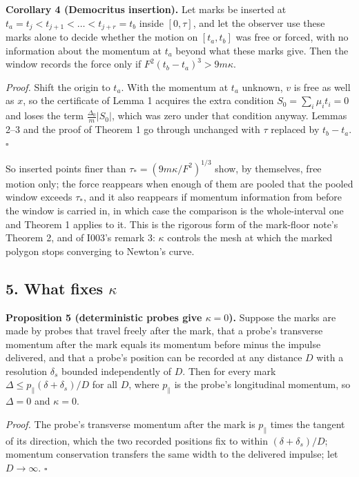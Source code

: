 \documentclass[11pt,a4paper]{article}
\begin{document}
\textbf{Corollary 4 (Democritus insertion).} Let marks be inserted at
\(t_a=t_{j}<t_{j+1}<\dots<t_{j+r}=t_b\) inside \([0,\tau]\), and let the
observer use these marks alone to decide whether the motion on
\([t_a,t_b]\) was free or forced, with no information about the momentum
at \(t_a\) beyond what these marks give. Then the window records the
force only if \(F^2(t_b-t_a)^3>9m\kappa\).

\emph{Proof.} Shift the origin to \(t_a\). With the momentum at \(t_a\)
unknown, \(v\) is free as well as \(x\), so the certificate of Lemma 1
acquires the extra condition \(S_0=\sum_i\mu_it_i=0\) and loses the term
\(\frac{\Delta_0}m|S_0|\), which was zero under that condition anyway.
Lemmas 2--3 and the proof of Theorem 1 go through unchanged with
\(\tau\) replaced by \(t_b-t_a\). \(\square\)

So inserted points finer than \(\tau_*=(9m\kappa/F^2)^{1/3}\) show, by
themselves, free motion only; the force reappears when enough of them
are pooled that the pooled window exceeds \(\tau_*\), and it also
reappears if momentum information from before the window is carried in,
in which case the comparison is the whole-interval one and Theorem 1
applies to it. This is the rigorous form of the mark-floor note's
Theorem 2, and of I003's remark 3: \(\kappa\) controls the mesh at which
the marked polygon stops converging to Newton's curve.

\hypertarget{what-fixes-kappa}{%
\subsection{\texorpdfstring{5. What fixes
\(\kappa\)}{5. What fixes \textbackslash kappa}}\label{what-fixes-kappa}}

\textbf{Proposition 5 (deterministic probes give \(\kappa=0\)).} Suppose
the marks are made by probes that travel freely after the mark, that a
probe's transverse momentum after the mark equals its momentum before
minus the impulse delivered, and that a probe's position can be recorded
at any distance \(D\) with a resolution \(\delta_s\) bounded
independently of \(D\). Then for every mark
\(\Delta\le p_\parallel(\delta+\delta_s)/D\) for all \(D\), where
\(p_\parallel\) is the probe's longitudinal momentum, so \(\Delta=0\)
and \(\kappa=0\).

\emph{Proof.} The probe's transverse momentum after the mark is
\(p_\parallel\) times the tangent of its direction, which the two
recorded positions fix to within \((\delta+\delta_s)/D\); momentum
conservation transfers the same width to the delivered impulse; let
\(D\to\infty\). \(\square\)
\end{document}
